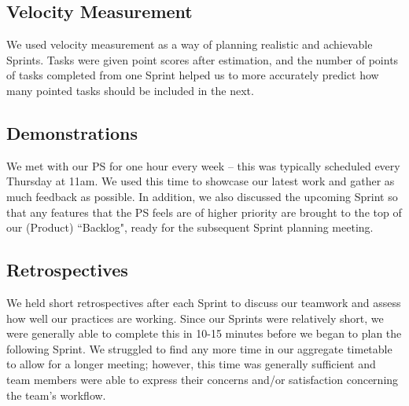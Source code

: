 \documentclass[a4paper, 10pt]{report}
\begin{document}
\subsection{Velocity Measurement}
We used velocity measurement as a way of planning realistic and achievable Sprints. Tasks were given point scores after estimation, and the number of points of tasks completed from one Sprint helped us to more accurately predict how many pointed tasks should be included in the next.

\subsection{Demonstrations}
We met with our PS for one hour every week -- this was typically scheduled every Thursday at 11am. We used this time to showcase our latest work and gather as much feedback as possible. In addition, we also discussed the upcoming Sprint so that any features that the PS feels are of higher priority are brought to the top of our (Product) ``Backlog", ready for the subsequent Sprint planning meeting.

\subsection{Retrospectives}
We held short retrospectives after each Sprint to discuss our teamwork and assess how well our practices are working. Since our Sprints were relatively short, we were generally able to complete this in 10-15 minutes before we began to plan the following Sprint. We struggled to find any more time in our aggregate timetable to allow for a longer meeting; however, this time was generally sufficient and team members were able to express their concerns and/or satisfaction concerning the team's workflow.
\end{document}
